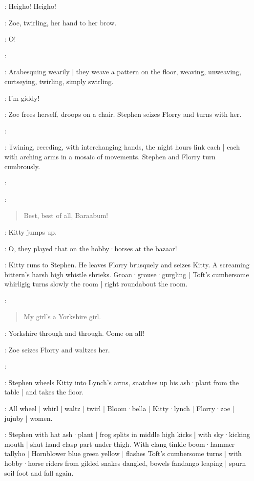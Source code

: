 \Bracelets:
Heigho!
Heigho!

:
Zoe,
twirling,
her hand to her brow.

\Zoe:
O!

\Maginni:

:
Arabesquing wearily |
they weave a pattern on the floor,
weaving,
unweaving,
curtseying,
twirling,
simply swirling.

\Zoe:
I'm giddy!

:
Zoe frees herself,
droops on a chair.
Stephen seizes Florry and turns with her.

\Maginni:

:
Twining,
receding,
with interchanging hands,
the night hours link each |
each with arching arms in a mosaic of movements.
%
Stephen and Florry turn cumbrously.

\Maginni:

\Pianola[2]:
\begin{verse}
    Best, best of all,
    Baraabum!
\end{verse}

:
Kitty jumps up.

\Kitty:
O,
they played that on the hobby·horses at the  bazaar!

:
Kitty runs to Stephen.
%
He leaves Florry brusquely and seizes Kitty.
A screaming bittern's harsh high whistle shrieks.
Groan·grouse·gurgling |
Toft's cumbersome whirligig turns slowly the room |
right roundabout the room.

\Pianola:
\begin{verse}
    My girl's a Yorkshire girl.
\end{verse}

\Zoe:
Yorkshire through and through.
Come on all!

:
Zoe seizes Florry and waltzes her.

\Stephen:

:
Stephen wheels Kitty into Lynch's arms,
snatches up his ash·plant from the table |
and takes the floor.

:
All wheel |
whirl |
waltz |
twirl |
Bloom·bella |
Kitty·lynch |
Florry·zoe |
jujuby |
women.

:
Stephen with hat ash·plant |
frog splits in middle high kicks |
with sky·kicking mouth |
shut hand clasp part under thigh.
With clang tinkle boom·hammer tallyho |
Hornblower blue green yellow |
flashes Toft's cumbersome turns |
with hobby·horse riders from gilded snakes dangled,
bowels fandango leaping |
spurn soil foot and fall again.

